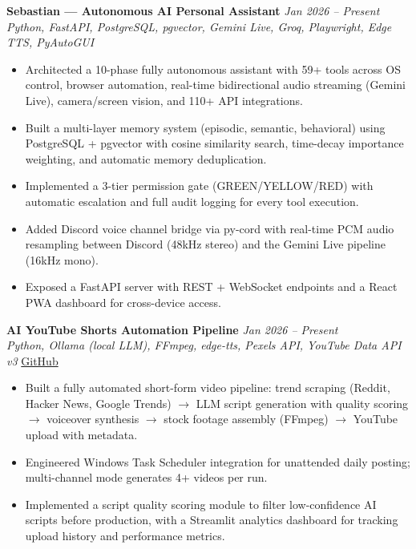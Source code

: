 \documentclass[11pt]{article}
\begin{document}
\vspace{4pt}
\textbf{Sebastian --- Autonomous AI Personal Assistant} \hfill \textit{Jan 2026 -- Present} \\
\textit{Python, FastAPI, PostgreSQL, pgvector, Gemini Live, Groq, Playwright, Edge TTS, PyAutoGUI}
\begin{itemize}
  \item Architected a 10-phase fully autonomous assistant with 59+ tools across OS control, browser automation, real-time bidirectional audio streaming (Gemini Live), camera/screen vision, and 110+ API integrations.
  \item Built a multi-layer memory system (episodic, semantic, behavioral) using PostgreSQL + pgvector with cosine similarity search, time-decay importance weighting, and automatic memory deduplication.
  \item Implemented a 3-tier permission gate (GREEN/YELLOW/RED) with automatic escalation and full audit logging for every tool execution.
  \item Added Discord voice channel bridge via py-cord with real-time PCM audio resampling between Discord (48kHz stereo) and the Gemini Live pipeline (16kHz mono).
  \item Exposed a FastAPI server with REST + WebSocket endpoints and a React PWA dashboard for cross-device access.
\end{itemize}

\vspace{4pt}
\textbf{AI YouTube Shorts Automation Pipeline} \hfill \textit{Jan 2026 -- Present} \\
\textit{Python, Ollama (local LLM), FFmpeg, edge-tts, Pexels API, YouTube Data API v3} \hfill \href{https://github.com/JeetInTech/Youtube-shorts-Automation}{GitHub}
\begin{itemize}
  \item Built a fully automated short-form video pipeline: trend scraping (Reddit, Hacker News, Google Trends) $\rightarrow$ LLM script generation with quality scoring $\rightarrow$ voiceover synthesis $\rightarrow$ stock footage assembly (FFmpeg) $\rightarrow$ YouTube upload with metadata.
  \item Engineered Windows Task Scheduler integration for unattended daily posting; multi-channel mode generates 4+ videos per run.
  \item Implemented a script quality scoring module to filter low-confidence AI scripts before production, with a Streamlit analytics dashboard for tracking upload history and performance metrics.
\end{itemize}
\end{document}

